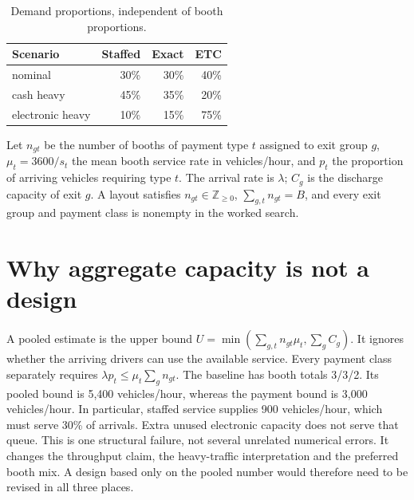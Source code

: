 \documentclass[12pt,letterpaper]{article}
\begin{document}
\begin{table}[htbp]\centering\small\caption{Demand proportions, independent of booth proportions.}\begin{tabular}{@{}lrrr@{}}\toprule
Scenario & Staffed & Exact & ETC\\\midrule
nominal & 30\% & 30\% & 40\%\\
cash heavy & 45\% & 35\% & 20\%\\
electronic heavy & 10\% & 15\% & 75\%\\
\bottomrule\end{tabular}\end{table}
Let $n_{gt}$ be the number of booths of payment type $t$ assigned to exit group $g$, $\mu_t=3600/s_t$ the mean booth service rate in vehicles/hour, and $p_t$ the proportion of arriving vehicles requiring type $t$. The arrival rate is $\lambda$; $C_g$ is the discharge capacity of exit $g$. A layout satisfies $n_{gt}\in\mathbb Z_{\ge0}$, $\sum_{g,t}n_{gt}=B$, and every exit group and payment class is nonempty in the worked search.
\section{Why aggregate capacity is not a design}
A pooled estimate is the upper bound $U=\min(\sum_{g,t}n_{gt}\mu_t,\sum_g C_g)$. It ignores whether the arriving drivers can use the available service. Every payment class separately requires $\lambda p_t\le\mu_t\sum_g n_{gt}$.
The baseline has booth totals 3/3/2. Its pooled bound is 5,400 vehicles/hour, whereas the payment bound is 3,000 vehicles/hour. In particular, staffed service supplies 900 vehicles/hour, which must serve 30\% of arrivals. Extra unused electronic capacity does not serve that queue.
This is one structural failure, not several unrelated numerical errors. It changes the throughput claim, the heavy-traffic interpretation and the preferred booth mix. A design based only on the pooled number would therefore need to be revised in all three places.
\end{document}

